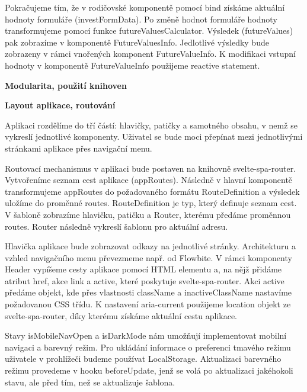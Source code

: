 Pokračujeme tím, že v rodičovské komponentě pomocí bind získáme aktuální hodnoty formuláře (investFormData). Po změně hodnot formuláře hodnoty transformujeme pomocí funkce futureValuesCalculator. 
Výsledek (futureValues) pak zobrazíme v komponentě FutureValuesInfo. Jedlotlivé výsledky bude zobrazeny v rámci vnořených komponent FutureValueInfo. 
K modifikaci vstupní hodnoty v komponentě FutureValueInfo použijeme reactive statement.

\begin{flushleft}
  \textbf{Modularita, použití knihoven}
\end{flushleft}

\begin{flushleft}
  \textbf{Layout aplikace, routování}
\end{flushleft}

Aplikaci rozdělíme do tří částí: hlavičky, patičky a samotného obsahu, v nemž se vykreslí jednotlivé komponenty. Uživatel se bude moci přepínat mezi jednotlivými stránkami aplikace přes navigační menu. 

Routovací mechanismus v aplikaci bude postaven na knihovně svelte-spa-router. Vytvořeníme seznam cest aplikace (appRoutes). 
Následně v hlavní komponentě transformujeme appRoutes do požadovaného formátu RouteDefinition a výsledek uložíme do proměnné routes. 
RouteDefinition je typ, který definuje seznam cest. V šabloně zobrazíme hlavičku, patičku a Router, kterému předáme proměnnou routes. 
Router následně vykreslí šablonu pro aktuální adresu.

Hlavička aplikace bude zobrazovat odkazy na jednotlivé stránky. Architekturu a vzhled navigačního menu převezmeme např. od Flowbite. 
V rámci komponenty Header vypíšeme cesty aplikace pomocí HTML elementu a, na nějž přidáme atribut href, akce link a active, které poskytuje svelte-spa-router. 
Akci active předáme objekt, kde přes vlastnosti className a inactiveClassName nastavíme požadovanou CSS třídu.
K nastavení aria-current použijeme location objekt ze svelte-spa-router, díky kterému získáme aktuální cestu aplikace.

Stavy isMobileNavOpen a isDarkMode nám umožňují implementovat mobilní navigaci a barevný režim. 
Pro ukládání informace o preferenci tmavého režimu uživatele v prohlížeči budeme používat LocalStorage. 
Aktualizaci barevného režimu provedeme v hooku beforeUpdate, jenž se volá po aktualizaci jakéhokoli stavu, ale před tím, než se aktualizuje šablona.